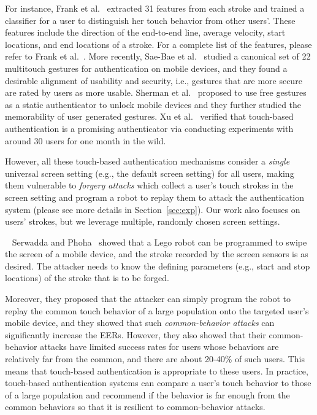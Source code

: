 \documentclass{sig-alternate-05-2015}
\newcommand{\myparatight}[1]{\smallskip\noindent{\bf {#1}:}~}
\begin{document}
For instance, Frank et al.~\cite{frank2013touchalytics} extracted 31 features
from each stroke and trained a classifier for a user to distinguish her touch
behavior from other users'. These features include the direction of the
end-to-end line, average velocity, start locations, and end locations of  a
stroke. For a complete list of the features, please refer to Frank et
al.~\cite{frank2013touchalytics}.
More recently, Sae-Bae et al.~\cite{sae2014multitouch} studied a canonical set
of 22 multitouch gestures for authentication on mobile devices, and they found a
desirable alignment of usability and security, i.e., gestures that are more
secure are rated by users as more usable. Sherman et al.~\cite{sherman2014user}
proposed to use free gestures as a static authenticator to unlock  mobile
devices and they further studied the memorability of user generated gestures.
Xu et al.~\cite{Xu2014soups}  verified that touch-based authentication is a
promising  authenticator  via conducting experiments with around 30 users for
one month in the wild. 







However, all these touch-based authentication mechanisms consider a \emph{single} 
universal screen setting (e.g., the default screen setting) for all users, 
making them vulnerable to \emph{forgery attacks} which collect a 
user's touch strokes in the screen setting and program a robot to 
replay them to attack the authentication system 
(please see more details in Section~\ref{sec:exp}). 
Our work also focuses on users' strokes, but we leverage multiple, randomly
chosen screen settings.

  







\myparatight{Common-behavior attacks} Serwadda and Phoha~\cite{attack-CCS13}
showed that a Lego robot can be programmed to swipe the screen of a mobile
device, and the stroke recorded by the screen sensors is as desired. 
The attacker needs to
know the defining parameters (e.g., start and stop
locations) of the stroke that is to be forged. 


Moreover,  they proposed that the attacker can simply program the robot to
replay the common touch behavior of a large population onto the targeted user's
mobile device, and they showed that such \emph{common-behavior attacks} can
significantly increase the EERs. However, they also showed that their
common-behavior attacks have limited success rates for users whose behaviors are
relatively far from the common, and there are about 20-40\% of such users. This
means that touch-based authentication is appropriate to these users. In
practice,  touch-based authentication systems can compare a user's touch
behavior to those of a large population and recommend if the behavior is far
enough from the common behaviors so that it is resilient to common-behavior
attacks. 
\end{document}
